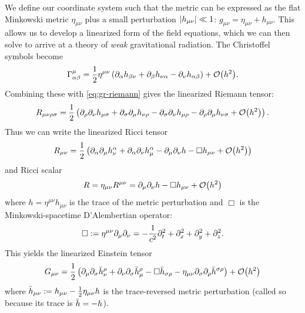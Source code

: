 We define our coordinate system such that the metric can be expressed as the flat Minkowski metric $\eta_{\mu\nu}$ plus a small perturbation $\abs{h_{\mu\nu}} \ll 1$: $g_{\mu \nu} = \eta_{\mu \nu} + h_{\mu \nu}$.
This allows us to develop a linearized form of the field equations, which we can then solve to arrive at a theory of \textit{weak} gravitational radiation.
The Christoffel symbols become
\begin{equation}\label{eq:gr-christoffel-lin}
	\Gamma_{\alpha \beta}^{\mu} = \frac{1}{2} \eta^{\mu\nu} \left( \partial_{\alpha} h_{\beta\nu} + \partial_{\beta} h_{\nu\alpha} - \partial_{\nu} h_{\alpha\beta} \right) + \order{h^2}.
\end{equation}
Combining these with \cref{eq:gr-riemann} gives the linearized Riemann tensor:
\begin{equation}\label{eq:gr-riemann-lin}
	R_{\mu\nu\rho\sigma} = \frac{1}{2} \left(
		\partial_{\rho} \partial_{\nu} h_{\mu \sigma}
		+ \partial_{\sigma} \partial_{\mu} h_{\nu \rho}
		- \partial_{\sigma} \partial_{\nu} h_{\mu \rho}
		- \partial_{\rho} \partial_{\mu} h_{\nu \sigma}
		+ \order{h^2}
	\right).
\end{equation}
Thus we can write the linearized Ricci tensor
\begin{equation}\label{eq:gr-ricci-tensor-lin}
	R_{\mu\nu} = \frac{1}{2} \left(
		\partial_{\alpha} \partial_{\mu} h_{\nu}^{\alpha}
		+ \partial_{\alpha} \partial_{\nu} h_{\mu}^{\alpha}
		- \partial_{\mu} \partial_{\nu} h
		- \Box h_{\mu\nu}
		+ \order{h^2}
	\right)
\end{equation}
and Ricci scalar
\begin{equation}\label{eq:gr-ricci-scalar-lin}
	R = \eta_{\mu\nu}R^{\mu\nu} = \partial_{\mu}\partial_{\nu}h - \Box h_{\mu\nu} + \order{h^2}
\end{equation}
where $h = \eta^{\mu\nu}h_{\mu\nu}$ is the trace of the metric perturbation and $\Box$ is the Minkowski-spacetime D'Alembertian operator:
\begin{equation}
	\Box \vcentcolon= \eta^{\mu\nu} \partial_{\mu} \partial_{\nu} = -\frac{1}{c^2} \partial_t^2 + \partial_x^2 + \partial_y^2 + \partial_z^2.
\end{equation}
This yields the linearized Einstein tensor
\begin{equation}\label{eq:gr-einstein-lin}
	G_{\mu\nu} =
		\frac{1}{2} \left( \partial_{\mu}\partial_{\sigma}\Bar{h}_{\nu}^{\rho}
		+ \partial_{\nu}\partial_{\sigma}\Bar{h}_{\mu}^{\rho}
		- \Box \Bar{h}_{\sigma \rho}
		- \eta_{\mu\nu}\partial_{\sigma}\partial_{\rho}\Bar{h}^{\sigma\rho} \right)
		+ \order{h^2}
\end{equation}
where $\Bar{h}_{\mu\nu} := h_{\mu\nu} - \frac{1}{2}\eta_{\mu\nu}h$ is the trace-reversed metric perturbation (called so because its trace is $\Bar{h} = -h$).

